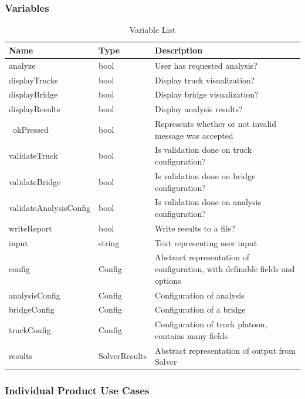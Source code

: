 \documentclass[12pt]{article}
\begin{document}
\subsubsection{Variables}
\begin{table}[H]
  \caption{Variable List} \label{TblVariableList}
  \begin{tabular}{p{} | p{} | p{}}
  \toprule
  \textbf{Name} & \textbf{Type} & \textbf{Description}\\
  \midrule
  analyze & bool & User has requested analysis?\\
  \midrule
  displayTrucks & bool & Display truck visualization?\\
  \midrule
  displayBridge & bool & Display bridge visualization?\\
  \midrule
  displayResults & bool & Display analysis results?\\
  \midrule\
  okPressed & bool & Represents whether or not invalid message was accepted\\
  \midrule
  validateTruck & bool & Is validation done on truck configuration?\\
  \midrule
  validateBridge & bool & Is validation done on bridge configuration?\\
  \midrule
  validateAnalysisConfig & bool & Is validation done on analysis configuration?\\
  \midrule
  writeReport & bool & Write results to a file?\\
  \midrule
  input & string & Text representing user input\\
  \midrule
  config & Config & Abstract representation of configuration, with definable fields and options\\
  \midrule
  analysisConfig & Config & Configuration of analysis\\
  \midrule
  bridgeConfig & Config & Configuration of a bridge\\
  \midrule
  truckConfig & Config & Configuration of truck platoon, contains many fields\\
  \midrule
  results & SolverResults & Abstract representation of output from Solver\\
  \bottomrule
\end{tabular}
\end{table}

\subsubsection{Individual Product Use Cases}
\end{document}
